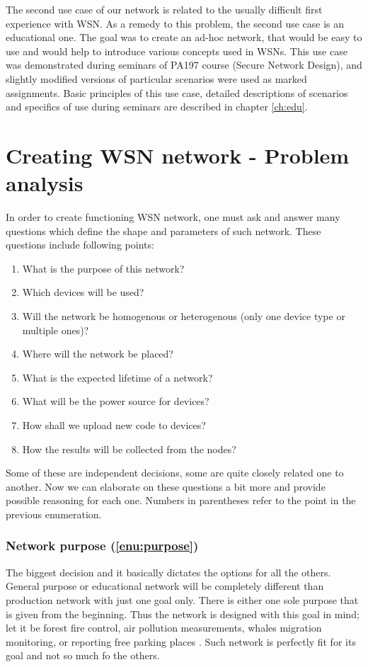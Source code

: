 \documentclass[
  print, %
  table,   %
  nolof,     %
  nolot,     %
           oneside
]{fithesis3}
\begin{document}
The second use case of our network is related to the usually difficult first experience with WSN. As a remedy to this problem, the second use case is an educational one. The goal was to create an ad-hoc network, that would be easy to use and would help to introduce various concepts used in WSNs. This use case was demonstrated during seminars of PA197 course (Secure Network Design), and slightly modified versions of particular scenarios were used as marked assignments. Basic principles of this use case, detailed descriptions of  scenarios and specifics of use during seminars are described in chapter \ref{ch:edu}.

\chapter{Creating WSN network - Problem analysis}\label{ch:analysis}
  In order to create functioning WSN network, one must ask and answer many questions which define the shape and parameters of such network. These questions include following points:

  \begin{enumerate}

    \item \label{enu:purpose}What is the purpose of this network?
    \item \label{enu:devices}Which devices will be used?
    \item \label{enu:type}Will the network be homogenous or heterogenous (only one device type or multiple ones)?
    \item \label{enu:place}Where will the network be placed?
    \item \label{enu:life}What is the expected lifetime of a network?
    \item \label{enu:power}What will be the power source for devices?
    \item \label{enu:upload}How shall we upload new code to devices?
    \item \label{enu:data}How the results will be collected from the nodes?

  \end{enumerate}

  Some of these are independent decisions, some are quite closely related one to another. Now we can elaborate on these questions a bit more and provide possible reasoning for each one. Numbers in parentheses refer to the point in the previous enumeration.

  \subsection{Network purpose (\ref{enu:purpose})}
  The biggest decision and it basically dictates the options for all the others. General purpose or educational network will be completely different than production network with just one goal only. There is either one sole purpose that is given from the beginning. Thus the network is designed with this goal in mind; let it be forest fire control, air pollution measurements, whales migration monitoring, or reporting free parking places \cite{sanchez2014smartsantander}. Such network is perfectly fit for its goal and not so much fo the others.
\end{document}
